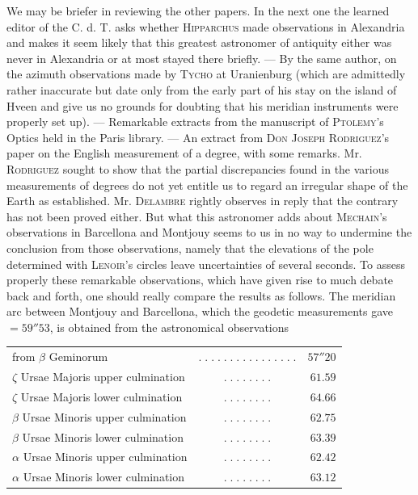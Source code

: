 We may be briefer in reviewing the other papers. In the next one the learned editor of the C. d. T. asks whether \textsc{Hipparchus} made observations in Alexandria and makes it seem likely that this greatest astronomer of antiquity either was never in Alexandria or at most stayed there briefly. --- By the same author, on the azimuth observations made by \textsc{Tycho} at Uranienburg (which are admittedly rather inaccurate but date only from the early part of his stay on the island of Hveen and give us no grounds for doubting that his meridian instruments were properly set up). --- Remarkable extracts from the manuscript of \textsc{Ptolemy}'s Optics held in the Paris library. --- An extract from \textsc{Don Joseph Rodriguez}'s paper on the English measurement of a degree, with some remarks. Mr. \textsc{Rodriguez} sought to show that the partial discrepancies found in the various measurements of degrees do not yet entitle us to regard an irregular shape of the Earth as established. Mr. \textsc{Delambre} rightly observes in reply that the contrary has not been proved either. But what this astronomer adds about \textsc{Mechain}'s observations in Barcellona and Montjouy seems to us in no way to undermine the conclusion from those observations, namely that the elevations of the pole determined with \textsc{Lenoir}'s circles leave uncertainties of several seconds. To assess properly these remarkable observations, which have given rise to much debate back and forth, one should really compare the results as follows. The meridian arc between Montjouy and Barcellona, which the geodetic measurements gave $=59''53$, is obtained from the astronomical observations
\begin{center}
\fontsize{9}{11}\selectfont\setlength{\tabcolsep}{3pt}\begin{tabular}{@{}l c r@{}}
from $\beta$ Geminorum & $.\;.\;.\;.\;.\;.\;.\;.\;.\;.\;.\;.\;.\;.\;.\;.$ & $57''20$\\
$\zeta$ Ursae Majoris upper culmination & $.\;.\;.\;.\;.\;.\;.\;.$ & $61.59$\\
$\zeta$ Ursae Majoris lower culmination & $.\;.\;.\;.\;.\;.\;.\;.$ & $64.66$\\
$\beta$ Ursae Minoris upper culmination & $.\;.\;.\;.\;.\;.\;.\;.$ & $62.75$\\
$\beta$ Ursae Minoris lower culmination & $.\;.\;.\;.\;.\;.\;.\;.$ & $63.39$\\
$\alpha$ Ursae Minoris upper culmination & $.\;.\;.\;.\;.\;.\;.\;.$ & $62.42$\\
$\alpha$ Ursae Minoris lower culmination & $.\;.\;.\;.\;.\;.\;.\;.$ & $63.12$\\
\end{tabular}
\end{center}
